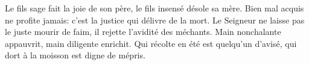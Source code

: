 Le fils sage fait la joie de son père,
	le fils insensé désole sa mère.
Bien mal acquis ne profite jamais:
	c’est la justice qui délivre de la mort.
Le Seigneur ne laisse pas le juste mourir de faim,
	il rejette l’avidité des méchants.
Main nonchalante appauvrit,
	main diligente enrichit.
Qui récolte en été est quelqu’un d’avisé,
	qui dort à la moisson est digne de mépris.
